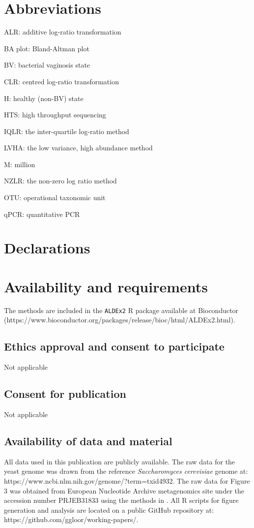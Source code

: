 \documentclass[graybox]{svmult}
\begin{document}
\section*{Abbreviations}

\noindent ALR: additive log-ratio transformation

\noindent BA plot: Bland-Altman plot

\noindent BV: bacterial vaginosis state

\noindent CLR: centred log-ratio transformation

\noindent H: healthy (non-BV) state

\noindent HTS: high throughput sequencing

\noindent IQLR: the inter-quartile log-ratio method

\noindent LVHA: the low variance, high abundance method

\noindent M: million

\noindent NZLR: the non-zero log ratio method

\noindent OTU: operational taxonomic unit

\noindent qPCR: quantitative PCR

\section*{Declarations} 

\section*{Availability and requirements}

The methods are included in the \texttt{ALDEx2} R package available at Bioconductor (https://www.bioconductor.org/packages/release/bioc/html/ALDEx2.html). 

\subsection*{Ethics approval and consent to participate}
Not applicable

\subsection*{Consent for publication}
Not applicable

\subsection*{Availability of data and material}
All data used in this publication are publicly available. The raw data for the yeast genome was drawn from the reference \textit{Saccharomyces cerevisiae} genome at: https://www.ncbi.nlm.nih.gov/genome/?term=txid4932. The raw data for Figure 3 was obtained from European Nucleotide Archive metagenomics site under the accession number PRJEB31833 using  the  methods in \cite{Macklaim:2018aa}. All R scripts for figure generation and analysis are located on a public GitHub repository at: https://github.com/ggloor/working-papers/.
\end{document}
